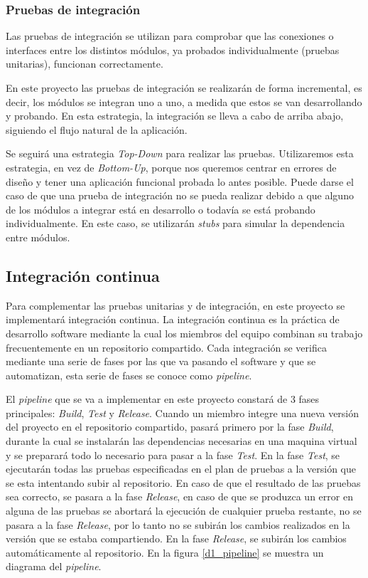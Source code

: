 \subsubsection{Pruebas de integración}
Las pruebas de integración se utilizan para comprobar que las conexiones o interfaces entre los distintos módulos, ya probados individualmente (pruebas unitarias), funcionan correctamente.

En este proyecto las pruebas de integración se realizarán de forma incremental, es decir, los módulos se integran uno a uno, a medida que estos se van desarrollando y probando. En esta estrategia, la integración se lleva a cabo de arriba abajo, siguiendo el flujo natural de la aplicación.

Se seguirá una estrategia \textit{Top-Down} para realizar las pruebas. Utilizaremos esta estrategia, en vez de \textit{Bottom-Up}, porque nos queremos centrar en errores de diseño y tener una aplicación funcional probada lo antes posible.
Puede darse el caso de que una prueba de integración no se pueda realizar debido a que alguno de los módulos a integrar está en desarrollo o todavía se está probando individualmente. En este caso, se utilizarán \textit{stubs} para simular la dependencia entre módulos.
\subsection{Integración continua}
Para complementar las pruebas unitarias y de integración, en este proyecto se implementará integración continua. La integración continua es la práctica de desarrollo software mediante la cual los miembros del equipo combinan su trabajo frecuentemente en un repositorio compartido. Cada integración se verifica mediante una serie de fases por las que va pasando el software y que se automatizan, esta serie de fases se conoce como \textit{pipeline}.

El \textit{pipeline} que se va a implementar en este proyecto constará de 3 fases principales: \textit{Build}, \textit{Test} y \textit{Release}. Cuando un miembro integre una nueva versión del proyecto en el repositorio compartido, pasará primero por la fase \textit{Build}, durante la cual se instalarán las dependencias necesarias en una maquina virtual y se preparará todo lo necesario para pasar a la fase \textit{Test}. En la fase \textit{Test}, se ejecutarán todas las pruebas especificadas en el plan de pruebas a la versión que se esta intentando subir al repositorio. En caso de que el resultado de las pruebas sea correcto, se pasara a la fase \textit{Release}, en caso de que se produzca un error en alguna de las pruebas se abortará la ejecución de cualquier prueba restante, no se pasara a la fase \textit{Release}, por lo tanto no se subirán los cambios realizados en la versión que se estaba compartiendo. En la fase \textit{Release}, se subirán los cambios automáticamente al repositorio. En la figura \ref{d1_pipeline} se muestra un diagrama del \textit{pipeline}.

